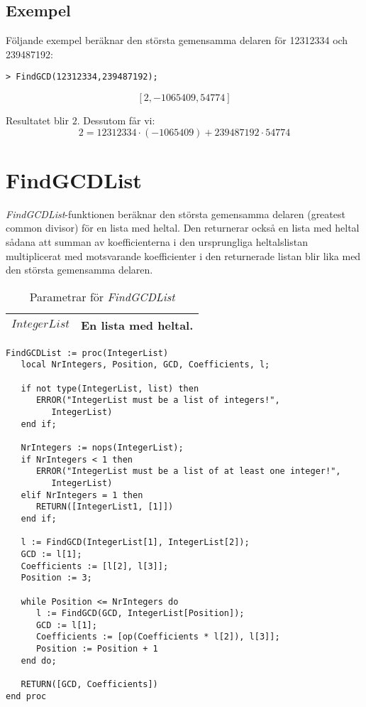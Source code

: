 \subsection{Exempel}

Följande exempel beräknar den största gemensamma delaren för 12312334 och 239487192:

\begin{verbatim}
> FindGCD(12312334,239487192);
\end{verbatim}
\[\left[2, -1065409, 54774\right]\]

Resultatet blir $2$. Dessutom får vi:
\[2 = 12312334 \cdot (-1065409) + 239487192 \cdot 54774\]

\section{FindGCDList}

\emph{FindGCDList}-funktionen beräknar den största gemensamma delaren (greatest common divisor) för en lista med heltal. Den returnerar också en lista med heltal sådana att summan av koefficienterna i den ursprungliga heltalslistan multiplicerat med motsvarande koefficienter i den returnerade listan blir lika med den största gemensamma delaren.

\begin{table}[h]
\caption{Parametrar för \emph{FindGCDList}}
\begin{center}
\begin{tabular}{|l|l|}
\hline
$IntegerList$ & En lista med heltal. \\
\hline
\end{tabular}
\end{center}
\end{table}

\begin{verbatim}
FindGCDList := proc(IntegerList)
   local NrIntegers, Position, GCD, Coefficients, l;

   if not type(IntegerList, list) then
      ERROR("IntegerList must be a list of integers!", 
         IntegerList)
   end if;

   NrIntegers := nops(IntegerList);
   if NrIntegers < 1 then
      ERROR("IntegerList must be a list of at least one integer!", 
         IntegerList)
   elif NrIntegers = 1 then
      RETURN([IntegerList1, [1]])
   end if;

   l := FindGCD(IntegerList[1], IntegerList[2]);
   GCD := l[1];
   Coefficients := [l[2], l[3]];
   Position := 3;

   while Position <= NrIntegers do
      l := FindGCD(GCD, IntegerList[Position]);
      GCD := l[1];
      Coefficients := [op(Coefficients * l[2]), l[3]];
      Position := Position + 1
   end do;

   RETURN([GCD, Coefficients])
end proc
\end{verbatim}

